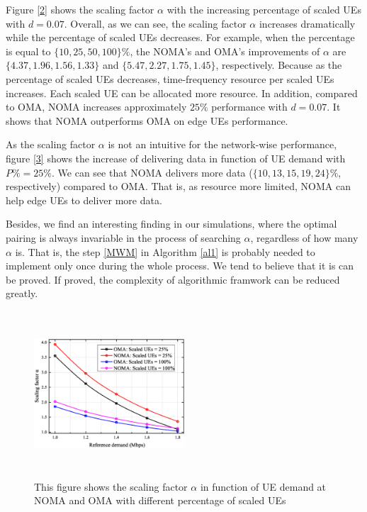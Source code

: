 \documentclass[10pt,journal,final,finalsubmission,twocolumn]{IEEEtran}
\begin{document}
Figure \ref{2} shows the scaling factor $\alpha $ with the increasing percentage of scaled UEs with $d = 0.07$. Overall, as we can see, the scaling factor $\alpha$ increases dramatically while the percentage of scaled UEs decreases. For example, when the percentage is equal to $\{10, 25, 50, 100\}\%$, the NOMA's and OMA's improvements of $\alpha$ are $\{4.37, 1.96, 1.56, 1.33\}$ and $\{5.47, 2.27, 1.75, 1.45\}$, respectively. Because as the percentage of scaled UEs decreases, time-frequency resource per scaled UEs increases. Each scaled UE can be allocated more resource. In addition, compared to OMA, NOMA increases approximately $25\%$ performance with $d=0.07$. It shows that NOMA outperforms OMA on edge UEs performance. 

As the scaling factor $\alpha$ is not an intuitive for the network-wise performance, figure \ref{3} shows the increase of delivering data in function of UE demand with $P\% = 25\%$. We can see that NOMA delivers more data ($\{10, 13, 15, 19, 24\}\%$, respectively) compared to OMA. That is, as resource more limited, NOMA can help edge UEs to deliver more data.

Besides, we find an interesting finding in our simulations, where the optimal pairing is always invariable in the process of searching $\alpha$, regardless of how many $\alpha$ is. That is, the step \ref{MWM} in Algorithm \ref{al1} is probably needed to implement only once during the whole process. We tend to believe that it is can be proved. If proved, the complexity of algorithmic framwork can be reduced greatly. 

\begin{figure}
\centering
\includegraphics[width=0.5\textwidth, height=6.2cm]{1.eps}
\caption{This figure shows the scaling factor $\alpha$ in function of UE demand at NOMA and OMA with different percentage of scaled UEs}
\label{1}
\end{figure}
\end{document}
